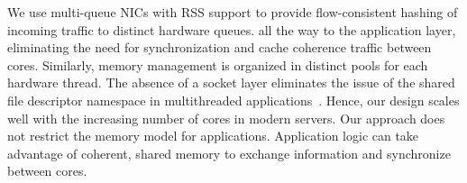  We use
multi-queue NICs with RSS support to provide flow-consistent hashing
of incoming traffic to distinct hardware queues.  all the way to the application layer,
eliminating the need for synchronization and cache coherence traffic
between cores. Similarly, memory management is organized in distinct
pools for each hardware thread. The absence of a socket layer
eliminates the issue of the shared file descriptor namespace in
multithreaded
applications~\cite{DBLP:conf/sosp/ClementsKZMK13}. Hence, our design
scales well with the increasing number of cores in modern servers. Our
approach does not restrict the memory model for
applications. Application logic can take advantage of coherent, shared
memory to exchange information and synchronize between cores.




